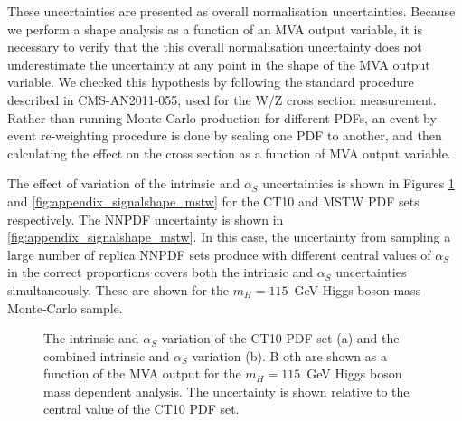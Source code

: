 These uncertainties are presented as overall normalisation uncertainties.
Because we perform a shape analysis as a function of an MVA output variable,
it is necessary to verify that the this overall normalisation uncertainty
does not underestimate the uncertainty at any point in the shape of the
MVA output variable.  We checked this hypothesis by following the standard
procedure described in CMS-AN2011-055, used for the W/Z cross section measurement.
Rather than running Monte Carlo production for different PDFs,
an event by event re-weighting procedure is done by scaling one PDF to another,
and then calculating the  effect on the cross section as a function of MVA output variable.

The effect of variation of the intrinsic and $\alpha_S$ uncertainties is shown in
Figures \ref{fig:appendix_signalshape_ct10} and \ref{fig:appendix_signalshape_mstw}
for the CT10 and MSTW PDF sets respectively.
The NNPDF uncertainty is shown in \ref{fig:appendix_signalshape_mstw}.
In this case, the uncertainty from sampling a large number of replica NNPDF sets produce with
different central values of $\alpha_S$ in the correct proportions covers both the
intrinsic and $\alpha_S$ uncertainties simultaneously.
These are shown for the $m_H=115$~GeV Higgs boson mass Monte-Carlo sample.

\begin{figure}[!hbtp]
\begin{center}
\label{fig:appendix_signalshape_ct10}
\caption{The intrinsic and $\alpha_S$ variation of the CT10 PDF set (a) and the combined intrinsic and $\alpha_S$ variation (b). B
oth are shown as a function of the MVA output for the $m_H=115$~GeV Higgs boson mass dependent analysis. The uncertainty is shown
relative to the central value of the CT10 PDF set.}
\end{center}
\end{figure}

